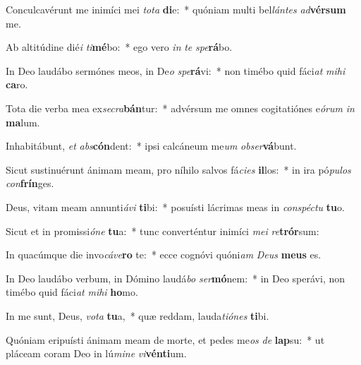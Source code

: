 \item Conculcavérunt me inimíci mei \textit{to}\textit{ta} \textbf{di}e:~* quóniam multi bel\textit{lán}\textit{tes} \textit{ad}\textbf{vér}\textbf{sum} me.
\item Ab altitúdine dié\textit{i} \textit{ti}\textbf{mé}bo:~* ego vero \textit{in} \textit{te} \textit{spe}\textbf{rá}bo.
\item In Deo laudábo sermónes meos, in De\textit{o} \textit{spe}\textbf{rá}vi:~* non timébo quid fáci\textit{at} \textit{mi}\textit{hi} \textbf{ca}ro.
\item Tota die verba mea ex\textit{se}\textit{cra}\textbf{bán}tur:~* advérsum me omnes cogitatiónes e\textit{ó}\textit{rum} \textit{in} \textbf{ma}lum.
\item Inhabitábunt, \textit{et} \textit{abs}\textbf{cón}dent:~* ipsi calcáneum me\textit{um} \textit{ob}\textit{ser}\textbf{vá}bunt.
\item Sicut sustinuérunt ánimam meam, pro níhilo salvos fá\textit{ci}\textit{es} \textbf{il}los:~* in ira pó\textit{pu}\textit{los} \textit{con}\textbf{frín}ges.
\item Deus, vitam meam annunti\textit{á}\textit{vi} \textbf{ti}bi:~* posuísti lácrimas meas in \textit{con}\textit{spéc}\textit{tu} \textbf{tu}o.
\item Sicut et in promissi\textit{ó}\textit{ne} \textbf{tu}a:~* tunc converténtur inimíci \textit{me}\textit{i} \textit{re}\textbf{trór}sum:
\item In quacúmque die invo\textit{cá}\textit{ve}\textbf{ro} te:~* ecce cognóvi quóni\textit{am} \textit{De}\textit{us} \textbf{me}\textbf{us} es.
\item In Deo laudábo verbum, in Dómino laudá\textit{bo} \textit{ser}\textbf{mó}nem:~* in Deo sperávi, non timébo quid fáci\textit{at} \textit{mi}\textit{hi} \textbf{ho}mo.
\item In me sunt, Deus, \textit{vo}\textit{ta} \textbf{tu}a,~* quæ reddam, lauda\textit{ti}\textit{ó}\textit{nes} \textbf{ti}bi.
\item Quóniam eripuísti ánimam meam de morte, et pedes me\textit{os} \textit{de} \textbf{lap}su:~* ut pláceam coram Deo in lú\textit{mi}\textit{ne} \textit{vi}\textbf{vén}\textbf{ti}um.
